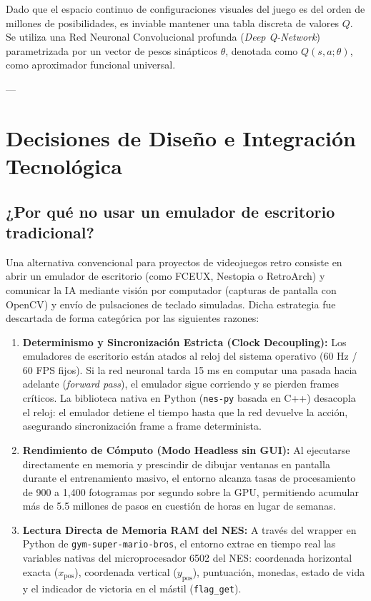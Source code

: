 \documentclass[11pt,letterpaper]{article}
\begin{document}
Dado que el espacio continuo de configuraciones visuales del juego es del orden de millones de posibilidades, es inviable mantener una tabla discreta de valores $Q$. Se utiliza una Red Neuronal Convolucional profunda (\textit{Deep Q-Network}) parametrizada por un vector de pesos sinápticos $\theta$, denotada como $Q(s, a; \theta)$, como aproximador funcional universal.

---

\section{Decisiones de Diseño e Integración Tecnológica}

\subsection{¿Por qué no usar un emulador de escritorio tradicional?}
Una alternativa convencional para proyectos de videojuegos retro consiste en abrir un emulador de escritorio (como FCEUX, Nestopia o RetroArch) y comunicar la IA mediante visión por computador (capturas de pantalla con OpenCV) y envío de pulsaciones de teclado simuladas. Dicha estrategia fue descartada de forma categórica por las siguientes razones:

\begin{enumerate}
    \item \textbf{Determinismo y Sincronización Estricta (Clock Decoupling):} Los emuladores de escritorio están atados al reloj del sistema operativo (60 Hz / 60 FPS fijos). Si la red neuronal tarda 15 ms en computar una pasada hacia adelante (\textit{forward pass}), el emulador sigue corriendo y se pierden frames críticos. La biblioteca nativa en Python (\texttt{nes-py} basada en C++) desacopla el reloj: el emulador detiene el tiempo hasta que la red devuelve la acción, asegurando sincronización frame a frame determinista.
    \item \textbf{Rendimiento de Cómputo (Modo Headless sin GUI):} Al ejecutarse directamente en memoria y prescindir de dibujar ventanas en pantalla durante el entrenamiento masivo, el entorno alcanza tasas de procesamiento de 900 a 1,400 fotogramas por segundo sobre la GPU, permitiendo acumular más de 5.5 millones de pasos en cuestión de horas en lugar de semanas.
    \item \textbf{Lectura Directa de Memoria RAM del NES:} A través del wrapper en Python de \texttt{gym-super-mario-bros}, el entorno extrae en tiempo real las variables nativas del microprocesador 6502 del NES: coordenada horizontal exacta ($x_{\text{pos}}$), coordenada vertical ($y_{\text{pos}}$), puntuación, monedas, estado de vida y el indicador de victoria en el mástil (\texttt{flag\_get}).
\end{enumerate}
\end{document}

